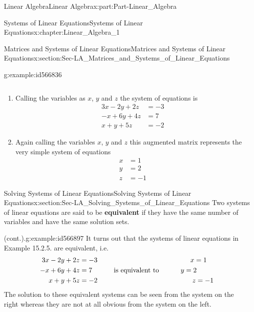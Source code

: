 \documentclass[oneside,10pt,]{book}
\newcommand{\terminology}[1]{\textbf{#1}}
\numberwithin{equation}{section}
\newcommand{\amp}{&}
\begin{document}
\begin{partptx}{Linear Algebra}{}{Linear Algebra}{}{}{x:part:Part-Linear_Algebra}
\begin{chapterptx}{Systems of Linear Equations}{}{Systems of Linear Equations}{}{}{x:chapter:Linear_Algebra_1}
\begin{sectionptx}{Matrices and Systems of Linear Equations}{}{Matrices and Systems of Linear Equations}{}{}{x:section:Sec-LA_Matrices_and_Systems_of_Linear_Equations}
\begin{example}{}{g:example:id566836}
\begin{enumerate}[label=(\alph*).]
\begin{equation*}
\end{equation*}
%
\end{enumerate}
%
\par\smallskip%
\noindent\hypertarget{g:solution:id566815}{}%
\begin{enumerate}[label=(\alph*).]
\item{}Calling the variables as \(x\), \(y\) and \(z\) the system of equations is%
\begin{align*}
3x-2y+2z \amp =-3\\
-x+6y+4z \amp =7\\
x+y+5z \amp =-2
\end{align*}
%
\item{}Again calling the variables \(x\), \(y\) and \(z\) this augmented matrix represents the very simple system of equations%
\begin{align*}
x \amp =1\\
y \amp =2\\
z \amp =-1
\end{align*}
%
\end{enumerate}
%
\end{example}
\end{sectionptx}
%
%
\typeout{************************************************}
\typeout{************************************************}
%
\begin{sectionptx}{Solving Systems of Linear Equations}{}{Solving Systems of Linear Equations}{}{}{x:section:Sec-LA_Solving_Systems_of_Linear_Equations}
Two systems of linear equations are said to be \terminology{equivalent} if they have the same number of variables and have the same solution sets.%
\begin{example}{(cont.).}{g:example:id566897}%
It turns out that the systems of linear equations in Example 15.2.5. are equivalent, i.e.%
\begin{align*}
3x-2y+2z \amp =-3 \hspace{48mm} x=1\\
-x+6y+4z \amp =7 \hspace{10mm} \textrm{ is equivalent to } \hspace{10mm} y=2\\
x+y+5z \amp =-2 \hspace{49mm} z=-1
\end{align*}
The solution to these equivalent systems can be seen from the system on the right whereas they are not at all obvious from the system on the left.%
\end{example}

\end{sectionptx}
\end{chapterptx}
\end{partptx}
\end{document}
